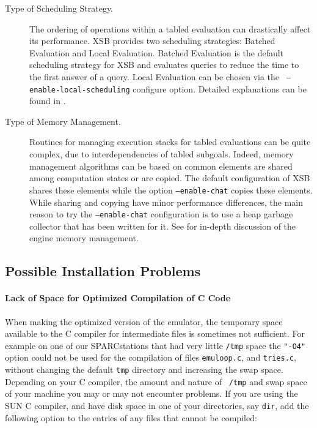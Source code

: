 \begin{description}
\item[Type of Scheduling Strategy.]  The ordering of operations within
a tabled evaluation can drastically affect its performance.  XSB
provides two scheduling strategies: Batched Evaluation and Local
Evaluation.  Batched Evaluation is the default scheduling strategy for
XSB and evaluates queries to reduce the time to the first answer of a
query.  Local Evaluation can be chosen via the {\tt
--enable-local-scheduling} configure option.  Detailed explanations
can be found in \cite{JFLP-Scheduling}.
%
\item[Type of Memory Management.]  Routines for managing execution
stacks for tabled evaluations can be quite complex, due to
interdependencies of tabled subgoals.  Indeed, memory management
algorithms can be based on common elements are shared among
computation states or are copied.  The default configuration of XSB
shares these elements while the option {\tt --enable-chat} copies
these elements.  While sharing and copying have minor performance
differences, the main reason to try the {\tt --enable-chat}
configuration is to use a heap garbage collector that has been written
for it.  See \cite{SaSw98,CAT@PLILP-98,CATmem@ISMM-98,CHAT@PADL-99}
for in-depth discussion of the engine memory management.
\end{description}

\subsection{Possible Installation Problems}


\paragraph*{Lack of Space for Optimized Compilation of C Code}
When making the optimized version of the emulator, the temporary space
available to the C compiler for intermediate files is sometimes not
sufficient. For example on one of our SPARCstations that had very
little {\tt /tmp} space the {\tt "-O4"} option could not be used for
the compilation of files {\tt emuloop.c}, and {\tt tries.c}, without
changing the default {\tt tmp} directory and increasing the swap
space.  Depending on your C compiler, the amount and nature of {\tt
/tmp} and swap space of your machine you may or may not encounter
problems.  If you are using the SUN C compiler, and have disk space in
one of your directories, say {\tt dir}, add the following option to
the entries of any files that cannot be compiled:

